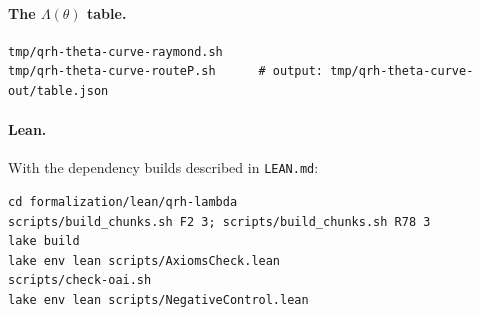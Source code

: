 \documentclass[11pt]{article}
\theoremstyle{definition}
\begin{document}
\paragraph{The $\Lambda(\theta)$ table.}
{\small
\begin{verbatim}
tmp/qrh-theta-curve-raymond.sh
tmp/qrh-theta-curve-routeP.sh      # output: tmp/qrh-theta-curve-out/table.json
\end{verbatim}}

\paragraph{Lean.} With the dependency builds described in \texttt{LEAN.md}:
{\small
\begin{verbatim}
cd formalization/lean/qrh-lambda
scripts/build_chunks.sh F2 3; scripts/build_chunks.sh R78 3
lake build
lake env lean scripts/AxiomsCheck.lean
scripts/check-oai.sh
lake env lean scripts/NegativeControl.lean
\end{verbatim}}



\end{document}
